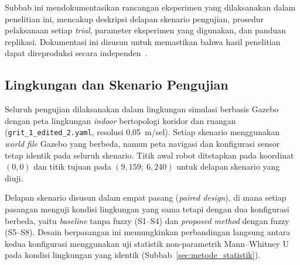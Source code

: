 Subbab ini mendokumentasikan rancangan eksperimen yang dilaksanakan dalam penelitian ini, mencakup deskripsi delapan skenario pengujian, prosedur pelaksanaan setiap \textit{trial}, parameter eksperimen yang digunakan, dan panduan replikasi. Dokumentasi ini disusun untuk memastikan bahwa hasil penelitian dapat direproduksi secara independen~\cite{Adiuku2024}.

\subsection{Lingkungan dan Skenario Pengujian}
\label{sec:skenario}

Seluruh pengujian dilaksanakan dalam lingkungan simulasi berbasis Gazebo dengan peta lingkungan \textit{indoor} bertopologi koridor dan ruangan (\texttt{grit\_1\_edited\_2.yaml}, resolusi 0,05~m/sel). Setiap skenario menggunakan \textit{world file} Gazebo yang berbeda, namun peta navigasi dan konfigurasi sensor tetap identik pada seluruh skenario. Titik awal robot ditetapkan pada koordinat $(0, 0)$ dan titik tujuan pada $(9{,}159;\ 6{,}240)$ untuk delapan skenario yang diuji.

Delapan skenario disusun dalam empat pasang (\textit{paired design}), di mana setiap pasangan menguji kondisi lingkungan yang sama tetapi dengan dua konfigurasi berbeda, yaitu \textit{baseline} tanpa fuzzy (S1--S4) dan \textit{proposed method} dengan fuzzy (S5--S8). Desain berpasangan ini memungkinkan perbandingan langsung antara kedua konfigurasi menggunakan uji statistik non-parametrik Mann--Whitney U pada kondisi lingkungan yang identik (Subbab~\ref{sec:metode_statistik}).

